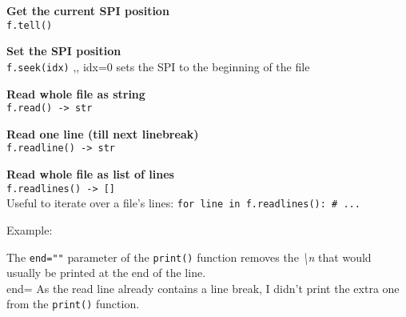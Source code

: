         \begin{indentblock}

            \textbf{Get the current SPI position} \\
            \texttt{f.tell()}

            \textbf{Set the SPI position} \\
            \texttt{f.seek(idx)} \sep{,}
            idx=0 sets the SPI to the beginning of the file

            \textbf{Read whole file as string} \\
            \texttt{f.read() -> str}

            \textbf{Read one line (till next linebreak)} \\
            \texttt{f.readline() -> str}

            \textbf{Read whole file as list of lines} \\
            \texttt{f.readlines() -> []} \\
            Useful to iterate over a file's lines: \texttt{for line in f.readlines(): # ...}

        \end{indentblock}

        Example:

        The \texttt{end=""} parameter of the \texttt{print()} function
        removes the \textit{\textbackslash n} that would usually be printed at the end of the line. \\end=
        As the read line already contains a line break, I didn't print the extra one from the
        \texttt{print()} function.

